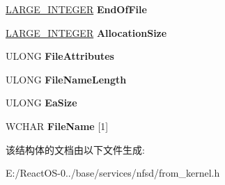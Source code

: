 \begin{DoxyCompactItemize}
\item 
\mbox{\label{struct___f_i_l_e___f_u_l_l___d_i_r___i_n_f_o_aa8c77bb3b6f28059921b1159bec15130}} 
\hyperlink{union___l_a_r_g_e___i_n_t_e_g_e_r}{L\+A\+R\+G\+E\+\_\+\+I\+N\+T\+E\+G\+ER} {\bfseries End\+Of\+File}
\item 
\mbox{\label{struct___f_i_l_e___f_u_l_l___d_i_r___i_n_f_o_a2edee5587a87eefcb38d56746c677f4d}} 
\hyperlink{union___l_a_r_g_e___i_n_t_e_g_e_r}{L\+A\+R\+G\+E\+\_\+\+I\+N\+T\+E\+G\+ER} {\bfseries Allocation\+Size}
\item 
\mbox{\label{struct___f_i_l_e___f_u_l_l___d_i_r___i_n_f_o_a125179bd22dd6920ef6a2565b64cf6c9}} 
U\+L\+O\+NG {\bfseries File\+Attributes}
\item 
\mbox{\label{struct___f_i_l_e___f_u_l_l___d_i_r___i_n_f_o_a194101e0fdc16dacf5daebce456cd426}} 
U\+L\+O\+NG {\bfseries File\+Name\+Length}
\item 
\mbox{\label{struct___f_i_l_e___f_u_l_l___d_i_r___i_n_f_o_a0023694c3c8308d1b88d4c01c28358c5}} 
U\+L\+O\+NG {\bfseries Ea\+Size}
\item 
\mbox{\label{struct___f_i_l_e___f_u_l_l___d_i_r___i_n_f_o_ade1bbbff96e92aeaf83e43cefef4df6a}} 
W\+C\+H\+AR {\bfseries File\+Name} \mbox{[}1\mbox{]}
\end{DoxyCompactItemize}


该结构体的文档由以下文件生成\+:\begin{DoxyCompactItemize}
\item 
E\+:/\+React\+O\+S-\/0../base/services/nfsd/from\+\_\+kernel.\+h\end{DoxyCompactItemize}
